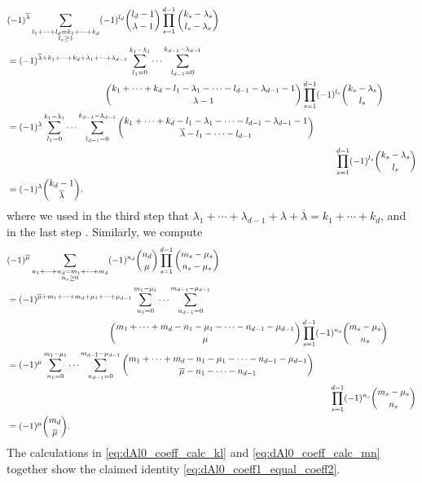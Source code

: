 \documentclass[12pt,reqno]{amsart}
\numberwithin{equation}{section}
\theoremstyle{definition}
\begin{document}
\begin{align} \label{eq:dAl0_coeff_calc_kl}
&(-1)^{\overline{\lambda}} \sum_{\substack{l_1+\cdots+l_d=k_1+\cdots+k_d \\ l_s\geq 1}} (-1)^{l_d}\binom{l_d-1}{\lambda-1} \prod_{s=1}^{d-1} \binom{k_s-\lambda_s}{l_s-\lambda_s} \\
&=(-1)^{\overline{\lambda}+k_1+\cdots+k_d+\lambda_1+\cdots+\lambda_{d-1}} \sum_{l_1=0}^{k_1-\lambda_1}\cdots \sum_{l_{d-1}=0}^{k_{d-1}-\lambda_{d-1}} \nonumber \\
&\hspace{3.8cm}\binom{k_1+\cdots+k_d-l_1-\lambda_1-\cdots-l_{d-1}-\lambda_{d-1}-1}{\lambda-1}\prod_{s=1}^{d-1} (-1)^{l_s} \binom{k_s-\lambda_s}{l_s} \nonumber \\
&=(-1)^{\lambda} \sum_{l_1=0}^{k_1-\lambda_1}\cdots \sum_{l_{d-1}=0}^{k_{d-1}-\lambda_{d-1}} \binom{k_1+\cdots+k_d-l_1-\lambda_1-\cdots-l_{d-1}-\lambda_{d-1}-1}{\overline{\lambda}-l_1-\cdots-l_{d-1}} \nonumber\\
&\hspace{12.7cm}\prod_{s=1}^{d-1} (-1)^{l_s} \binom{k_s-\lambda_s}{l_s} \nonumber\\
&=(-1)^{\lambda}\binom{k_d-1}{\overline{\lambda}}. \nonumber
\end{align}
where we used in the third step that $\lambda_1+\cdots+\lambda_{d-1}+\lambda+\overline{\lambda}=k_1+\cdots+k_d$, and in the last step \cite[Lemma 3.23]{Bu23}. Similarly, we compute
\begin{align} \label{eq:dAl0_coeff_calc_mn}
&(-1)^{\overline{\mu}} \sum_{\substack{n_1+\cdots+n_d=m_1+\cdots+m_d \\ n_s\geq0}} (-1)^{n_d} \binom{n_d}{\mu} \prod_{s=1}^{d-1} \binom{m_s-\mu_s}{n_s-\mu_s} \\
&=(-1)^{\overline{\mu}+m_1+\cdots+m_d+\mu_1+\cdots+\mu_{d-1}} \sum_{n_1=0}^{m_1-\mu_1}\cdots \sum_{n_{d-1}=0}^{m_{d-1}-\mu_{d-1}} \nonumber\\
&\hspace{4cm}\binom{m_1+\cdots+m_d-n_1-\mu_1-\cdots-n_{d-1}-\mu_{d-1}}{\mu}\prod_{s=1}^{d-1}(-1)^{n_s} \binom{m_s-\mu_s}{n_s} \nonumber\\
&=(-1)^{\mu}\sum_{n_1=0}^{m_1-\mu_1}\cdots \sum_{n_{d-1}=0}^{m_{d-1}-\mu_{d-1}} \binom{m_1+\cdots+m_d-n_1-\mu_1-\cdots-n_{d-1}-\mu_{d-1}}{\overline{\mu}-n_1-\cdots-n_{d-1}} \nonumber\\
&\hspace{12.6cm}\prod_{s=1}^{d-1}(-1)^{n_s} \binom{m_s-\mu_s}{n_s} \nonumber\\
&=(-1)^{\mu} \binom{m_d}{\overline{\mu}}. \nonumber
\end{align}
The calculations in \eqref{eq:dAl0_coeff_calc_kl} and \eqref{eq:dAl0_coeff_calc_mn} together show the claimed identity \eqref{eq:dAl0_coeff1_equal_coeff2}.
\end{document}
